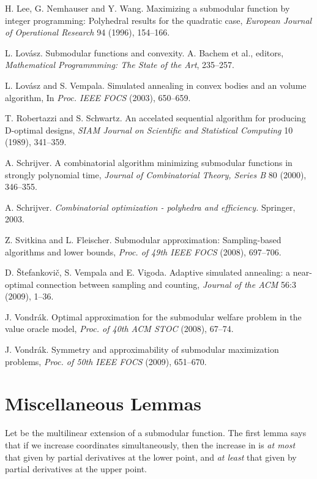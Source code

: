 \documentclass{article}[11pt]
\begin{document}
\begin{thebibliography}{99}
 H. Lee, G. Nemhauser and Y. Wang.
Maximizing a submodular function by integer programming:
Polyhedral results for the quadratic case,
{\em European Journal of Operational Research} 94 (1996), 154--166.

 L. Lov\'asz.
Submodular functions and convexity.
A. Bachem et al., editors, {\em Mathematical Programmming: The State of the Art}, 235--257.

 L. Lov\'asz and S. Vempala.
Simulated annealing in convex bodies and an  volume algorithm,
In {\em Proc.  IEEE FOCS} (2003), 650--659.

 T. Robertazzi and S. Schwartz.
An accelated sequential algorithm for producing D-optimal designs,
{\em SIAM Journal on Scientific and Statistical Computing} 10 (1989), 341--359.

 A. Schrijver.
A combinatorial algorithm minimizing submodular functions in strongly polynomial time,
{\em Journal of Combinatorial Theory, Series B} 80 (2000), 346--355.

 A. Schrijver.
{\em Combinatorial optimization - polyhedra and efficiency.}
Springer, 2003.

Z. Svitkina and L. Fleischer.
Submodular approximation: Sampling-based algorithms and lower bounds,
\emph{Proc. of 49th IEEE FOCS} (2008), 697--706.

 D. \v{S}tefankovi\v{c}, S. Vempala and E. Vigoda.
Adaptive simulated annealing: a near-optimal connection between sampling and counting,
{\em Journal of the ACM} 56:3 (2009), 1--36. 

 J. Vondr\'ak.
Optimal approximation for the submodular welfare problem in the value oracle model,
{\em Proc. of 40th ACM STOC} (2008), 67--74.

 J. Vondr\'ak.
Symmetry and approximability of submodular maximization problems,
{\em Proc. of 50th IEEE FOCS} (2009), 651--670.


\end{thebibliography}






\appendix

\section{Miscellaneous Lemmas}
\label{app:misc}

Let  be the multilinear extension of a submodular function.
The first lemma says that if we increase coordinates simultaneously, then the increase
in  is {\em at most} that given by partial derivatives at the lower point,
and {\em at least} that given by partial derivatives at the upper point.
\end{document}
